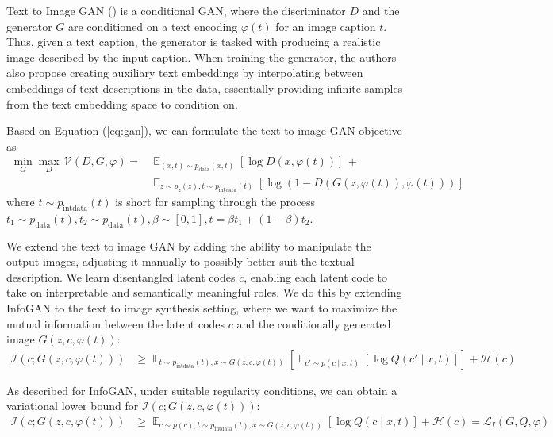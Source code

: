 \documentclass{article}
\DeclareMathOperator*{\E}{\mathbb{E}}
\begin{document}
Text to Image GAN (\cite{text2image}) is a conditional GAN, where the discriminator $D$ and the generator $G$ are conditioned on a text encoding $\varphi(t)$ for an image caption $t$. Thus, given a text caption, the generator is tasked with producing a realistic image described by the input caption. When training the generator, the authors also propose creating auxiliary text embeddings by interpolating between embeddings of text descriptions in the data, essentially providing infinite samples from the text embedding space to condition on.

Based on Equation (\ref{eq:gan}), we can formulate the text to image GAN objective as
\begin{align}
\min_G \max_D\, \mathcal{V}(D,G, \varphi) =& \E_{(x,t) \sim p_{\text{data}}(x,t)}\left[\log D(x, \varphi(t))\right]\, + \nonumber\\
&\E_{z\sim p_z(z), t\sim p_{\text{intdata}}(t)}\left[\log(1-D(G(z, \varphi(t)), \varphi(t)))\right] \label{eq:t2i}
\end{align}
where $t \sim p_{\text{intdata}}(t)$ is short for sampling through the process $t_1 \sim p_{\text{data}}(t), t_2 \sim p_{\text{data}}(t), \beta \sim [0,1], t = \beta t_1 + (1-\beta) t_2$.

We extend the text to image GAN by adding the ability to manipulate the output images, adjusting it manually to possibly better suit the textual description. We learn disentangled latent codes $c$, enabling each latent code to take on interpretable and semantically meaningful roles. We do this by extending InfoGAN to the text to image synthesis setting, where we want to maximize the mutual information between the latent codes $c$ and the conditionally generated image $G(z,c,\varphi(t))$:
\begin{align}
\mathcal{I}(c;G(z,c,\varphi(t))) &\geq \E_{t\sim p_{\text{intdata}}(t), x\sim G(z,c,\varphi(t))}\left[\E_{c'\sim p(c\mid x,t)}\left[\log Q(c'\mid x,t)\right]\right] + \mathcal{H}(c)
\end{align}

As described for InfoGAN, under suitable regularity conditions, we can obtain a variational lower bound for $\mathcal{I}(c;G(z,c,\varphi(t)))$:
\begin{align}
\mathcal{I}(c;G(z,c, \varphi(t))) &\geq \E_{c\sim p(c), t\sim p_{\text{intdata}}(t), x\sim G(z,c, \varphi(t))}\left[\log Q(c\mid x,t)\right] + \mathcal{H}(c) = \mathcal{L}_I(G,Q,\varphi) \label{eq:t2imiloss}
\end{align}
\end{document}
